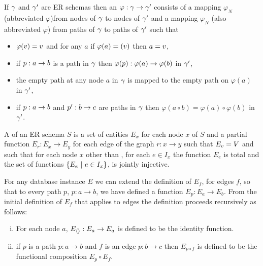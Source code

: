 \begin{definition}
\label{ERschemamapping}
If $\gamma$ and  $\gamma'$ are ER schemas then an  
$\varphi : \gamma \rightarrow \gamma'$ consists of a mapping $\varphi_N$ (abbreviated $\varphi$)from nodes of
$\gamma$ to nodes of $\gamma'$ and a mapping $\varphi_N$ (also abbreviated $\varphi$) from 
paths of $\gamma$ to paths of $\gamma'$ such that
\begin{itemize}
\item $\varphi(v)=v$ and for any $a$ if $\varphi(a)=(v)$ then
$a = v$,
\item  if $p:a \rightarrow b$ is a path in $\gamma$ then $\varphi(p):\varphi(a) \rightarrow \varphi(b)$ in $\gamma'$,
\item the empty path at any node $a$ in $\gamma$ is mapped to the empty path
on $\varphi(a)$ in $\gamma'$,
\item if $p: a \rightarrow b$ and $p': b \rightarrow c$ are paths in $\gamma$
then $\varphi(a \circ b) = \varphi(a) \circ \varphi(b)$ in $\gamma'$.
\end{itemize}
\end{definition}
 
\begin{definition}
\noindent A   of an ER schema $S$ is
a set of entities $E_x$ for each node $x$ of $S$ and 
a partial function $E_r : E_x \rightarrow E_y$ for each edge of the graph $r:x \rightarrow y$ 
such that $E_v=V$
and such that 
for each node $x$ other than \veee, for each $e \in I_x$ the function $E_e$ is total and
the set of functions $\left\{E_e \ \middle|\ e \in I_x\right\}$, is jointly injective.
\end{definition}

\noindent For any database instance $E$ we can  extend  the definition of
$E_f$, for edges $f$,  so that to every path $p$, $p: a \rightarrow b$,  we have defined a function $E_p: E_a \rightarrow E_b$. From the initial definition of $E_f$ that applies to 
edges the definition proceeds recursively as follows: 
\begin{enumerate} [(i)]
\item{
For each node $a$, $E_{\langle\rangle}: E_a \rightarrow E_a$ is defined to be the identity function.
}
\item{
if $p$ is a path $p: a \rightarrow b$ and $f$ is an edge $p: b \rightarrow c$ then $E_{p \circ f}$  
is defined to be the functional composition $E_p \circ E_f$. 
}
\end{enumerate}

